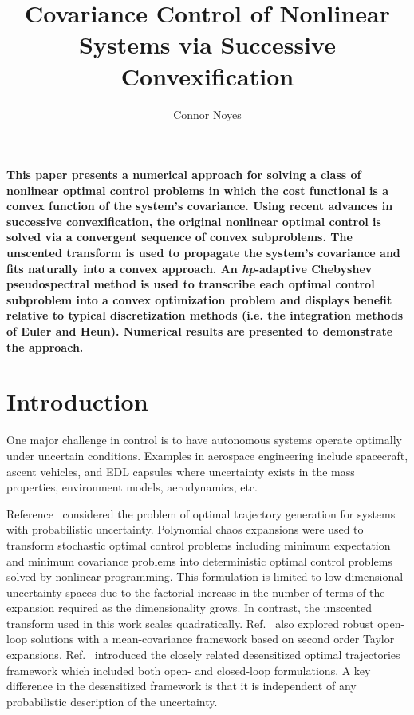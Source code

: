 \documentclass[10pt,a4paper]{article}
\author{Connor Noyes}
\title{Covariance Control of Nonlinear Systems via Successive Convexification}
\begin{document}
	\maketitle




	\section*{}
	\textbf{This paper presents a numerical approach for solving a class of nonlinear optimal control problems in which the cost functional is a convex function of the system's covariance. Using recent advances in successive convexification, the original nonlinear optimal control is solved via a convergent sequence of convex subproblems. The unscented transform is used to propagate the system's covariance and fits naturally into a convex approach. An \textit{hp}-adaptive Chebyshev pseudospectral method is used to transcribe each optimal control subproblem into a convex optimization problem and displays benefit relative to typical discretization methods (i.e. the integration methods of Euler and Heun). Numerical results are presented to demonstrate the approach.}
	
	\section{Introduction}
	One major challenge in control is to have autonomous systems operate optimally under uncertain conditions. Examples in aerospace engineering include spacecraft, ascent vehicles, and EDL capsules where uncertainty exists in the mass properties, environment models, aerodynamics, etc.

	Reference~\cite{PCE_OCP_Bhattacharya} considered the problem of optimal trajectory generation for systems with probabilistic uncertainty. Polynomial chaos expansions were used to transform stochastic optimal control problems including minimum expectation and minimum covariance problems into deterministic optimal control problems solved by nonlinear programming. This formulation is limited to low dimensional uncertainty spaces due to the factorial increase in the number of terms of the expansion required as the dimensionality grows. In contrast, the unscented transform used in this work scales quadratically. Ref.~\cite{OpenLoopUncertain} also explored robust open-loop solutions with a mean-covariance framework based on second order Taylor expansions. Ref.~\cite{Desensitized} introduced the closely related desensitized optimal trajectories framework which included both open- and closed-loop formulations. A key difference in the desensitized framework is that it is independent of any probabilistic description of the uncertainty.
	
\end{document}
